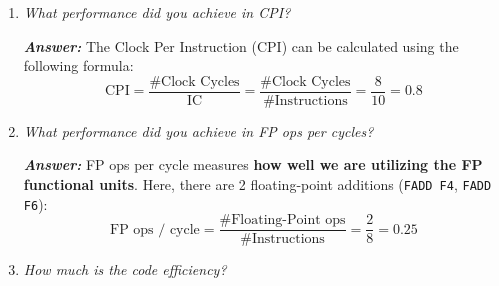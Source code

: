 \begin{enumerate}
\begin{center}
    \end{center}

    \newpage

    \item \emph{What performance did you achieve in CPI?}

    \textcolor{Green3}{\textbf{\emph{Answer:}}} The Clock Per Instruction (CPI) can be calculated using the following formula:
    \begin{equation*}
        \text{CPI} = \dfrac{\text{\# Clock Cycles}}{\text{IC}} = \dfrac{\text{\# Clock Cycles}}{\text{\# Instructions}} = \dfrac{8}{10} = 0.8
    \end{equation*}


    \item \emph{What performance did you achieve in FP ops per cycles?}
    
    \textcolor{Green3}{\textbf{\emph{Answer:}}} FP ops per cycle measures \textbf{how well we are utilizing the FP functional units}. Here, there are 2 floating-point additions (\texttt{FADD F4}, \texttt{FADD F6}):
    \begin{equation*}
        \text{FP ops / cycle} = \dfrac{\text{\# Floating-Point ops}}{\text{\# Instructions}} = \dfrac{2}{8} = 0.25
    \end{equation*}


    \item \emph{How much is the code efficiency?}
    

\end{enumerate}
